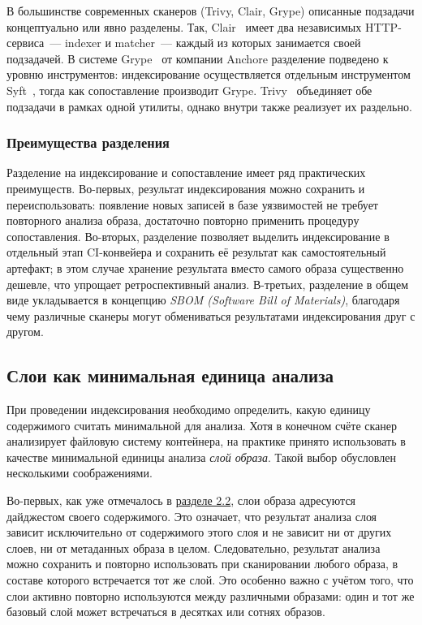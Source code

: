 В большинстве современных сканеров (Trivy, Clair, Grype) описанные подзадачи концептуально или явно разделены. Так, Clair~\cite{clair} имеет два независимых HTTP-сервиса~--- indexer и matcher~--- каждый из которых занимается своей подзадачей. В системе Grype~\cite{grype} от компании Anchore разделение подведено к уровню инструментов: индексирование осуществляется отдельным инструментом Syft~\cite{syft}, тогда как сопоставление производит Grype. Trivy~\cite{trivy} объединяет обе подзадачи в рамках одной утилиты, однако внутри также реализует их раздельно.

\subsubsection{Преимущества разделения}

Разделение на индексирование и сопоставление имеет ряд практических преимуществ. Во-первых, результат индексирования можно сохранить и переиспользовать: появление новых записей в базе уязвимостей не требует повторного анализа образа, достаточно повторно применить процедуру сопоставления. Во-вторых, разделение позволяет выделить индексирование в отдельный этап CI-конвейера и сохранить её результат как самостоятельный артефакт; в этом случае хранение результата вместо самого образа существенно дешевле, что упрощает ретроспективный анализ. В-третьих, разделение в общем виде укладывается в концепцию \textit{SBOM (Software Bill of Materials)}, благодаря чему различные сканеры могут обмениваться результатами индексирования друг с другом.

\subsection{Слои как минимальная единица анализа}

При проведении индексирования необходимо определить, какую единицу содержимого считать минимальной для анализа. Хотя в конечном счёте сканер анализирует файловую систему контейнера, на практике принято использовать в качестве минимальной единицы анализа \textit{слой образа}. Такой выбор обусловлен несколькими соображениями.

Во-первых, как уже отмечалось в \hyperref[subsec:oci-structure]{разделе 2.2}, слои образа адресуются дайджестом своего содержимого. Это означает, что результат анализа слоя зависит исключительно от содержимого этого слоя и не зависит ни от других слоев, ни от метаданных образа в целом. Следовательно, результат анализа можно сохранить и повторно использовать при сканировании любого образа, в составе которого встречается тот же слой. Это особенно важно с учётом того, что слои активно повторно используются между различными образами: один и тот же базовый слой может встречаться в десятках или сотнях образов.

